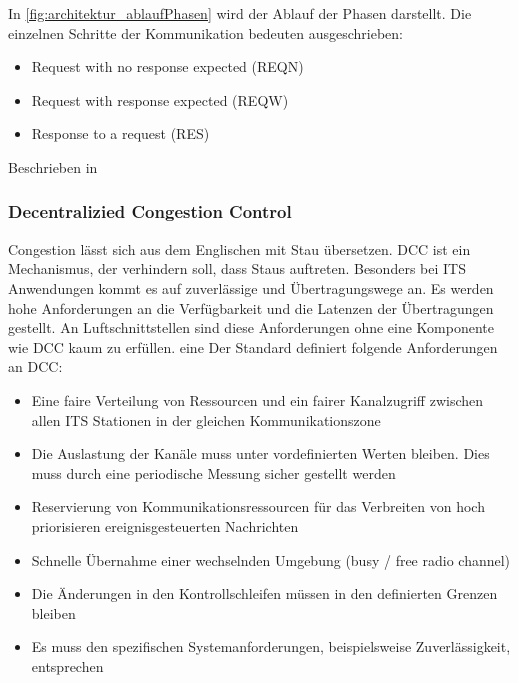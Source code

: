In \autoref{fig:architektur_ablaufPhasen} wird der Ablauf der Phasen darstellt. Die einzelnen Schritte der Kommunikation bedeuten ausgeschrieben:
\begin{itemize}
	\item Request with no response expected (REQN)
	\item Request with response expected (REQW)
	\item Response to a request (RES)
\end{itemize}

Beschrieben in \cite{etsi102723-2}



\subsubsection{Decentralizied Congestion Control\label{architektur_dcc}}
Congestion lässt sich aus dem Englischen mit Stau übersetzen. \ac{DCC} ist ein Mechanismus, der verhindern soll, dass Staus auftreten. Besonders bei \ac{ITS} Anwendungen kommt es auf zuverlässige und Übertragungswege an. Es werden hohe Anforderungen an die Verfügbarkeit und die Latenzen der Übertragungen gestellt. An Luftschnittstellen sind diese Anforderungen ohne eine Komponente wie \ac{DCC} kaum zu erfüllen. eine Der Standard \cite{etsi102687} definiert folgende Anforderungen an \ac{DCC}:
\begin{itemize}
	\item Eine faire Verteilung von Ressourcen und ein fairer Kanalzugriff zwischen allen \ac{ITS} Stationen in der gleichen Kommunikationszone
	\item Die Auslastung der Kanäle muss unter vordefinierten Werten bleiben. Dies muss durch eine periodische Messung sicher gestellt werden
	\item Reservierung von Kommunikationsressourcen für das Verbreiten von hoch priorisieren ereignisgesteuerten Nachrichten
	\item Schnelle Übernahme einer wechselnden Umgebung (busy / free radio channel)
	\item Die Änderungen in den Kontrollschleifen müssen in den definierten Grenzen bleiben
	\item Es muss den spezifischen Systemanforderungen, beispielsweise Zuverlässigkeit, entsprechen
\end{itemize}

